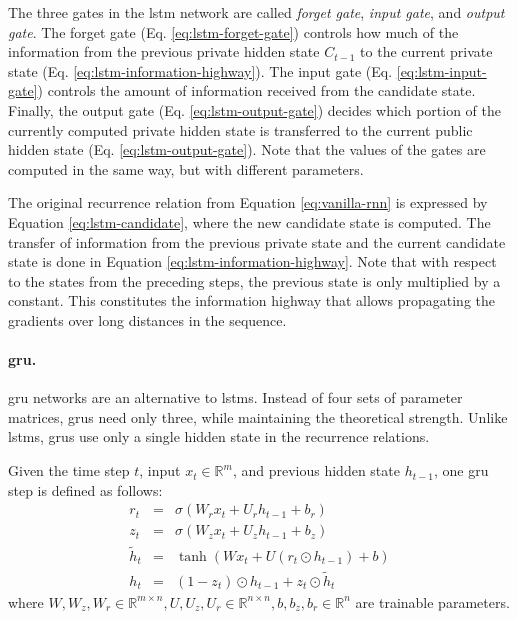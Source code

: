The three gates in the \gls{lstm} network are called \emph{forget gate},
\emph{input gate}, and \emph{output gate}. The forget gate (Eq.
\ref{eq:lstm-forget-gate}) controls how much of the information from the
previous private hidden state $C_{t-1}$ to the current private state (Eq.
\ref{eq:lstm-information-highway}). The input gate (Eq.
\ref{eq:lstm-input-gate}) controls the amount of information received from the
candidate state. Finally, the output gate (Eq. \ref{eq:lstm-output-gate})
decides which portion of the currently computed private hidden state is
transferred to the current public hidden state
(Eq. \ref{eq:lstm-output-gate}). Note that the values of the gates are computed
in the same way, but with different parameters.

The original recurrence relation from Equation \ref{eq:vanilla-rnn} is expressed
by Equation \ref{eq:lstm-candidate}, where the new candidate state is
computed. The transfer of information from the previous private state and the
current candidate state is done in Equation
\ref{eq:lstm-information-highway}. Note that with respect to the states from the
preceding steps, the previous state is only multiplied by a constant. This
constitutes the information highway that allows propagating the gradients over
long distances in the sequence.




\paragraph{\acrshort{gru}.} \acrlong{gru} networks \citep{cho2014gru} are an
alternative to \glspl{lstm}. Instead of four sets of parameter matrices,
\glspl{gru} need only three, while maintaining the theoretical strength. Unlike
\glspl{lstm}, \glspl{gru} use only a single hidden state in the recurrence
relations.
 
Given the time step $t$, input $x_t \in \mathbb{R}^m$, and previous hidden state
$h_{t-1}$, one \gls{gru} step is defined as follows:
%
\begin{eqnarray} r_t & = & \sigma\left(W_r x_t + U_r h_{t-1} + b_r\right)
\label{eq:gru-reset-gate} \\ z_t & = & \sigma\left(W_z x_t + U_z h_{t-1} +
b_z\right)
\label{eq:gru-update-gate} \\ \tilde{h}_t & = & \tanh \left(W x_t + U \left( r_t
\odot h_{t-1} \right) + b \right) \label{eq:gru-candidate} \\ h_t & = & (1 -
z_t) \odot h_{t-1} + z_t \odot \tilde{h}_t
\label{eq:gru-hidden-state}
\end{eqnarray}
%
where $W, W_z, W_r \in \mathbb{R}^{m\times n}, U, U_z, U_r \in \mathbb{R}^{n
\times n}, b, b_z, b_r \in \mathbb{R}^n$ are trainable parameters.

